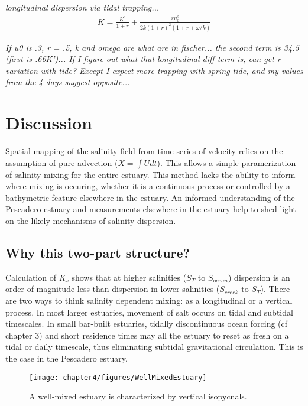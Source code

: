 \emph{longitudinal dispersion via tidal trapping...}
\begin{eqnarray}
K = \frac{K^{'}}{1+r} + \frac{ru_0^2}{2k(1+r)^2(1+r+\omega / k)} \label{eq:KxOkubo}
\end{eqnarray}

\emph{If u0 is .3, r = .5, k and omega are what are in fischer... the second term is 34.5 (first is .66K')... If I figure out what that longitudinal diff term is, can get r variation with tide? Except I expect more trapping with spring tide, and my values from the 4 days suggest opposite...}

\section{Discussion} \label{sec:discCh4}

Spatial mapping of the salinity field from time series of velocity relies on the assumption of pure advection ($X = \int{U}dt$). This allows a simple paramerization of salinity mixing for the entire estuary. This method lacks the ability to inform where mixing is occuring, whether it is a continuous process or controlled by a bathymetric feature elsewhere in the estuary. An informed understanding of the Pescadero estuary and measurements elsewhere in the estuary help to shed light on the likely mechanisms of salinity dispersion.

\subsection{Why this two-part structure?}

Calculation of \emph{K$_x$} shows that at higher salinities ($S_T$ to $S_{ocean}$) dispersion is an order of magnitude less than dispersion in lower salinities ($S_{creek}$ to $S_T$). There are two ways to think salinity dependent mixing: as a longitudinal or a vertical process. In most larger estuaries, movement of salt occurs on tidal and subtidal timescales. In small bar-built estuaries, tidally discontinuous ocean forcing (cf chapter 3) and short residence times may all the estuary to reset as fresh on a tidal or daily timescale, thus eliminating subtidal gravitational circulation. This is the case in the Pescadero estuary.

\begin{figure}[h]
\centering
	\texttt{[image: chapter4/figures/WellMixedEstuary]}
	\caption{A well-mixed estuary is characterized by vertical isopycnals.} \label{fig:WellMixedEstuary}
\end{figure}

